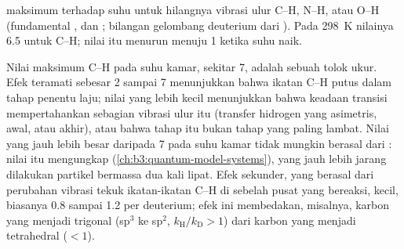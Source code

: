 \begin{omfigure}

{\small {} maksimum terhadap suhu untuk hilangnya
vibrasi ulur C--H, N--H, atau O--H (fundamental ,  dan ;
bilangan gelombang deuterium dari ). Pada \qty{298}{K}
nilainya 6.5 untuk C--H; nilai itu menurun menuju 1 ketika suhu naik.}
\end{omfigure}

Nilai maksimum C--H pada suhu kamar, sekitar 7, adalah sebuah tolok ukur. Efek
teramati sebesar 2 sampai 7 menunjukkan bahwa ikatan C--H putus dalam tahap
penentu laju; nilai yang lebih kecil menunjukkan bahwa keadaan transisi
mempertahankan sebagian vibrasi ulur itu (transfer hidrogen yang asimetris,
awal, atau akhir), atau bahwa tahap itu bukan tahap yang paling lambat. Nilai
yang jauh lebih besar daripada 7 pada suhu kamar tidak mungkin berasal dari
: nilai itu mengungkap 
(\cref{ch:b3:quantum-model-systems}), yang jauh lebih jarang dilakukan partikel
bermassa dua kali lipat. Efek sekunder, yang berasal dari perubahan vibrasi
tekuk ikatan-ikatan C--H di sebelah pusat yang bereaksi, kecil, biasanya 0.8
sampai 1.2 per deuterium; efek ini membedakan, misalnya, karbon yang menjadi
trigonal (sp$^3$ ke sp$^2$, $k_{\mathrm H}/k_{\mathrm D} > 1$) dari karbon yang menjadi
tetrahedral ($< 1$).

